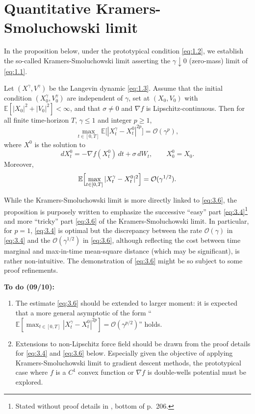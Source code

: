 \documentclass[11pt]{article}
\begin{document}
\section{Quantitative Kramers-Smoluchowski limit}

In the proposition below, under the prototypical condition \eqref{eq:1.2}, we establish the so-called Kramers-Smoluchowski limit asserting the $\gamma\downarrow 0$ (zero-mass) limit of \eqref{eq:1.1}.

\begin{proposition}\label{prop:ks}
Let $(X^{\gamma},V^{\gamma})$ be the Langevin dynamic \eqref{eq:1.3}.
Assume that the initial condition $(X_0^{\gamma},V_0^{\gamma})$ are independent of $\gamma$, set at $(X_0,V_0)$ with $\mathbb{E}[|X_0|^2+|V_0|^2]<\infty$, and that $\sigma\neq 0$ and $\nabla f$ is Lipschitz-continuous.
Then for all finite time-horizon $T$, $\gamma\le 1$ and integer $p\ge1$,
\begin{equation}
\label{eq:3.4}
\max_{t\in[0,T]}\mathbb{E}\bigl[|X_t^{\gamma}-X_t^0|^{2p}\bigr]=\mathcal{O}(\gamma^p),
\end{equation}
where $X^0$ is the solution to
\begin{equation}
\label{eq:3.5}
dX_t^0=-\nabla f(X_t^0)\,dt+\sigma\,dW_t,\qquad X_0^0=X_0.
\end{equation}
Moreover,
\begin{equation}
\label{eq:3.6}
\mathbb{E}\Bigl[\max_{t\in[0,T]}|X_t^{\gamma}-X_t^0|^2\Bigr]=\mathcal{O}(\gamma^{1/2}).
\end{equation}
\end{proposition}

While the Kramers-Smoluchowski limit is more directly linked to \eqref{eq:3.6}, the proposition is purposely written to emphasize the successive ``easy'' part \eqref{eq:3.4}\footnote{Stated without proof details in \cite{p14}, bottom of p.~206.} and more ``tricky'' part \eqref{eq:3.6} of the Kramers-Smoluchowski limit.
In particular, for $p=1$, \eqref{eq:3.4} is optimal but the discrepancy between the rate $\mathcal{O}(\gamma)$ in \eqref{eq:3.4} and the $\mathcal{O}(\gamma^{1/2})$ in \eqref{eq:3.6}, although reflecting the cost between time marginal and max-in-time mean-square distance (which may be significant), is rather non-intuitive.
The demonstration of \eqref{eq:3.6} might be so subject to some proof refinements.

\textbf{To do (09/10):}
\begin{enumerate}
\item The estimate \eqref{eq:3.6} should be extended to larger moment: it is expected that a more general asymptotic of the form ``$\mathbb{E}[\max_{t\in[0,T]}|X_t^{\gamma}-X_t^0|^{2p}]=\mathcal{O}(\gamma^{p/2})$'' holds.
\item Extensions to non-Lipschitz force field should be drawn from the proof details for \eqref{eq:3.4} and \eqref{eq:3.6} below. Especially given the objective of applying Kramers-Smoluchowski limit to gradient descent methods, the prototypical case where $f$ is a $C^1$ convex function or $\nabla f$ is double-wells potential must be explored.
\end{enumerate}
\end{document}
